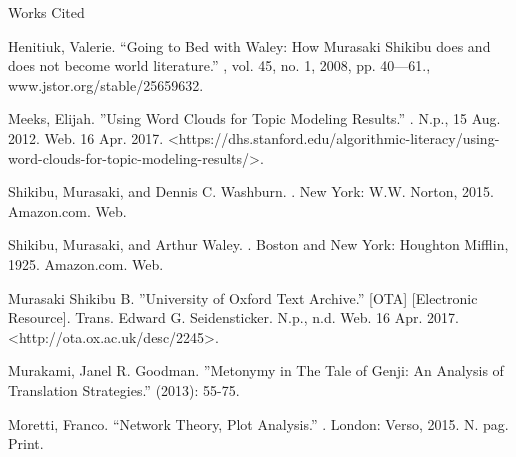 \documentclass[12pt]{article}
\newcommand{\bibent}{\noindent \hangindent 40pt}
\newenvironment{workscited}{\newpage \begin{center} Works Cited \end{center}}{\newpage }
\begin{document}
\begin{flushleft}
\begin{spacing}{2.0}
\begin{workscited}
\bibent Henitiuk, Valerie. ``Going to Bed with Waley: How Murasaki Shikibu does and does not become world literature.'' , vol. 45, no. 1, 2008, pp. 40---61., www.jstor.org/stable/25659632.

\bibent Meeks, Elijah. ''Using Word Clouds for Topic Modeling Results.'' . N.p., 15 Aug. 2012. Web. 16 Apr. 2017. <https://dhs.stanford.edu/algorithmic-literacy/using-word-clouds-for-topic-modeling-results/>.

\bibent Shikibu, Murasaki, and Dennis C. Washburn. . New York: W.W. Norton, 2015. Amazon.com. Web.

\bibent Shikibu, Murasaki, and Arthur Waley. . Boston and New York: Houghton Mifflin, 1925. Amazon.com. Web.

\bibent Murasaki Shikibu B. ''University of Oxford Text Archive.'' [OTA]  [Electronic Resource]. Trans. Edward G. Seidensticker. N.p., n.d. Web. 16 Apr. 2017. <http://ota.ox.ac.uk/desc/2245>.

\bibent Murakami, Janel R. Goodman. ''Metonymy in The Tale of Genji: An Analysis of Translation Strategies.''  (2013): 55-75.

\bibent Moretti, Franco. ``Network Theory, Plot Analysis.'' . London: Verso, 2015. N. pag. Print.

\end{workscited}



\end{spacing}
\end{flushleft}
\end{document}
